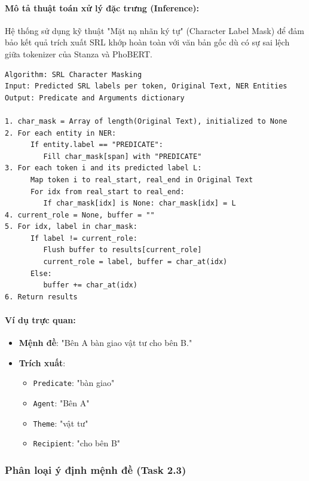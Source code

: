 \paragraph{Mô tả thuật toán xử lý đặc trưng (Inference):}
Hệ thống sử dụng kỹ thuật "Mặt nạ nhãn ký tự" (Character Label Mask) để đảm bảo kết quả trích xuất SRL khớp hoàn toàn với văn bản gốc dù có sự sai lệch giữa tokenizer của Stanza và PhoBERT.

\begin{verbatim}
Algorithm: SRL Character Masking
Input: Predicted SRL labels per token, Original Text, NER Entities
Output: Predicate and Arguments dictionary

1. char_mask = Array of length(Original Text), initialized to None
2. For each entity in NER:
      If entity.label == "PREDICATE":
         Fill char_mask[span] with "PREDICATE"
3. For each token i and its predicted label L:
      Map token i to real_start, real_end in Original Text
      For idx from real_start to real_end:
         If char_mask[idx] is None: char_mask[idx] = L
4. current_role = None, buffer = ""
5. For idx, label in char_mask:
      If label != current_role:
         Flush buffer to results[current_role]
         current_role = label, buffer = char_at(idx)
      Else:
         buffer += char_at(idx)
6. Return results
\end{verbatim}

\paragraph{Ví dụ trực quan:}
\begin{itemize}
    \item \textbf{Mệnh đề}: "Bên A bàn giao vật tư cho bên B."
    \item \textbf{Trích xuất}:
    \begin{itemize}
        \item \texttt{Predicate}: "bàn giao"
        \item \texttt{Agent}: "Bên A"
        \item \texttt{Theme}: "vật tư"
        \item \texttt{Recipient}: "cho bên B"
    \end{itemize}
\end{itemize}

\subsubsection{Phân loại ý định mệnh đề (Task 2.3)}

